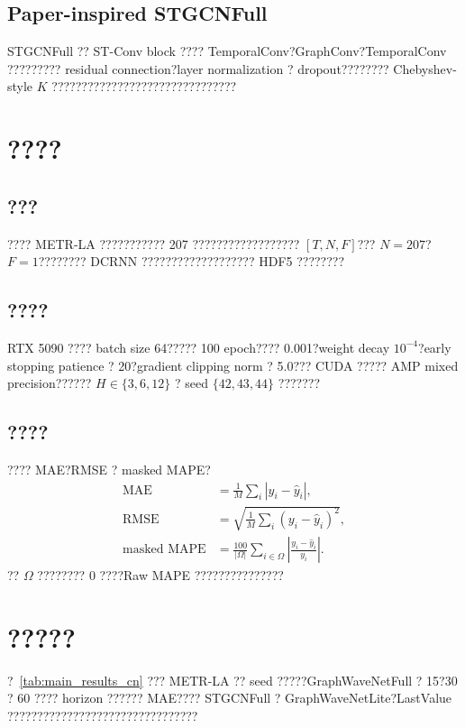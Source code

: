 \documentclass[11pt]{ctexart}
\begin{document}
\subsection{Paper-inspired STGCNFull}
STGCNFull ?? ST-Conv block ???? TemporalConv?GraphConv?TemporalConv ????????? residual connection?layer normalization ? dropout???????? Chebyshev-style $K$ ???????????????????????????????

\section{????}
\subsection{???}
???? METR-LA ??????????? 207 ?????????????????? $[T,N,F]$??? $N=207$?$F=1$???????? DCRNN ??????????????????? HDF5 ????????

\subsection{????}
RTX 5090 ???? batch size 64????? 100 epoch???? 0.001?weight decay $10^{-4}$?early stopping patience ? 20?gradient clipping norm ? 5.0??? CUDA ????? AMP mixed precision?????? $H\in\{3,6,12\}$ ? seed $\{42,43,44\}$ ???????

\subsection{????}
???? MAE?RMSE ? masked MAPE?
\begin{align}
  \operatorname{MAE} &= \frac{1}{M}\sum_i |y_i-\hat{y}_i|,\\
  \operatorname{RMSE} &= \sqrt{\frac{1}{M}\sum_i (y_i-\hat{y}_i)^2},\\
  \operatorname{masked\ MAPE} &= \frac{100}{|\Omega|}\sum_{i\in\Omega}\left|\frac{y_i-\hat{y}_i}{y_i}\right|.
\end{align}
?? $\Omega$ ???????? 0 ????Raw MAPE ???????????????

\section{?????}
?~\ref{tab:main_results_cn} ??? METR-LA ?? seed ?????GraphWaveNetFull ? 15?30 ? 60 ???? horizon ?????? MAE???? STGCNFull ? GraphWaveNetLite?LastValue ????????????????????????????????
\end{document}
